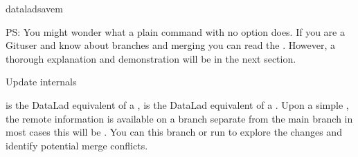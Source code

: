 \begin{sphinxVerbatim}[commandchars=\\\{\}]
dataladsave\PYGZhy{}m
\end{sphinxVerbatim}

\sphinxAtStartPar
PS: You might wonder what a plain  command with no option does.
If you are a Git\sphinxhyphen{}user and know about branches and merging you can read the
. However, a thorough explanation
and demonstration will be in the next section.

\ignorespaces \begin{gitusernote}[label={index-2}, before title={\thetcbcounter\ }, check odd page=true]{Update internals}
\label{\detokenize{basics/101-119-sharelocal4:index-2}}

\sphinxAtStartPar
{} is the DataLad equivalent of a ,
 is the DataLad equivalent of a
.
Upon a simple , the remote information
is available on a branch separate from the main branch
\textendash{} in most cases this will be .
You can  this branch or run  to
explore the changes and identify potential merge conflicts.


\end{gitusernote}

\sphinxstepscope

\ignorespaces 

